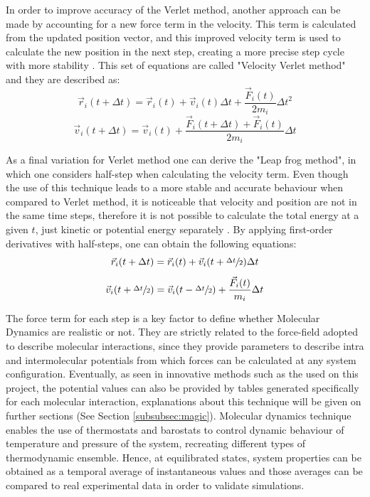 \documentclass[10pt,a4paper,twoside]{article}
\begin{document}
In order to improve accuracy of the Verlet method, another approach can be made by accounting for a new force term in the velocity. This term is calculated from the updated position vector, and this improved velocity term is used to calculate the new position in the next step, creating a more precise step cycle with more stability \cite{satoh}. This set of equations are called "Velocity Verlet method" and they are described as:
\begin{equation}
\vec{r}_i(t+\Delta t) = \vec{r}_i(t) + \vec{v}_i(t)\Delta t + \dfrac{\vec{F}_i(t)}{2m_i}{\Delta t}^2
\label{eqn:vverletr}
\end{equation}
\begin{equation}
\vec{v}_i(t+\Delta t) = \vec{v}_i(t) + \dfrac{\vec{F}_i(t+\Delta t)+\vec{F}_i(t)}{2m_i}\Delta t
\label{eqn:vverletv}
\end{equation}

As a final variation for Verlet method one can derive the "Leap frog method", in which one considers half-step when calculating the velocity term. Even though the use of this technique leads to a more stable and accurate behaviour when compared to Verlet method, it is noticeable that velocity and position are not in the same time steps, therefore it is not possible to calculate the total energy at a given $t$, just kinetic or potential energy separately \cite{umd}. By applying first-order derivatives with half-steps, one can obtain the following equations:
\begin{equation}
\vec{r}_i(t+\Delta t) = \vec{r}_i(t) + \vec{v}_i(t+\sfrac{\Delta t}{2})\Delta t
\label{eqn:leapfrogr}
\end{equation}
\begin{equation}
\vec{v}_i(t+\sfrac{\Delta t}{2}) = \vec{v}_i(t-\sfrac{\Delta t}{2}) + \dfrac{\vec{F}_i(t)}{m_i}\Delta t
\label{eqn:leapfrogv}
\end{equation}

The force term for each step is a key factor to define whether Molecular Dynamics are realistic or not. They are strictly related to the force-field adopted to describe molecular interactions, since they provide parameters to describe intra and intermolecular potentials from which forces can be calculated at any system configuration. Eventually, as seen in innovative methods such as the used on this project, the potential values can also be provided by tables generated specifically for each molecular interaction, explanations about this technique will be given on further sections (See Section \ref{subsubsec:magic}). Molecular dynamics technique enables the use of thermostats and barostats to control dynamic behaviour of temperature and pressure of the system, recreating different types of thermodynamic ensemble. Hence, at equilibrated states, system properties can be obtained as a temporal average of instantaneous values and those averages can be compared to real experimental data in order to validate simulations.
\end{document}
